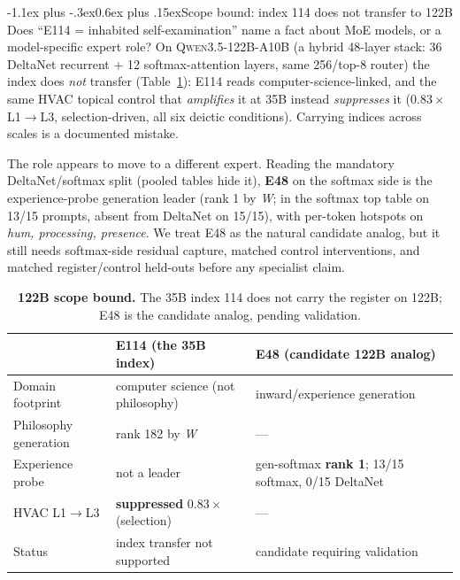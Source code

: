 \documentclass[10pt]{article}
\makeatletter
\renewcommand\section{\@startsection{section}{1}{\z@}%
  {-1.1ex plus -.3ex}{0.6ex plus .15ex}{\normalfont\large\bfseries}}
\newcommand{\W}{\textit{W}}
\makeatother
\begin{document}
\vspace{-0.4em}
\section{Scope bound: index 114 does not transfer to 122B}
\vspace{-0.2em}
Does ``E114 = inhabited self-examination'' name a fact about MoE models, or a
model-specific expert role? On \textsc{Qwen3.5-122B-A10B} (a hybrid 48-layer stack: 36 DeltaNet
recurrent + 12 softmax-attention layers, same 256/top-8 router) the index does
\emph{not} transfer (Table~\ref{tab:transfer}): E114 reads
computer-science-linked, and the same HVAC topical control that \emph{amplifies}
it at 35B instead \emph{suppresses} it ($0.83\times$ L1$\to$L3, selection-driven,
all six deictic conditions). Carrying indices across scales is a documented
mistake.

The role appears to move to a different expert. Reading the mandatory
DeltaNet/softmax split (pooled tables hide it), \textbf{E48} on the softmax side
is the experience-probe generation leader (rank 1 by \W; in the softmax top table
on 13/15 prompts, absent from DeltaNet on 15/15), with per-token hotspots on
\textit{hum, processing, presence}. We treat E48 as the natural candidate analog,
but it still needs softmax-side residual capture, matched control interventions,
and matched register/control held-outs before any specialist claim.

\begin{table}[t]
\centering\small
\setlength{\tabcolsep}{6pt}
\begin{tabular}{@{}lll@{}}
\toprule
& \textbf{E114 (the 35B index)} & \textbf{E48 (candidate 122B analog)} \\
\midrule
Domain footprint & computer science (not philosophy) & inward/experience generation \\
Philosophy generation & rank 182 by \W & --- \\
Experience probe & not a leader & gen-softmax \textbf{rank 1}; 13/15 softmax, 0/15 DeltaNet \\
HVAC L1$\rightarrow$L3 & \textbf{suppressed} $0.83\times$ (selection) & --- \\
Status & index transfer not supported & candidate requiring validation \\
\bottomrule
\end{tabular}
\caption{\textbf{122B scope bound.} The 35B index 114 does not carry the register
on 122B; E48 is the candidate analog, pending validation.}
\label{tab:transfer}
\vspace{-1.4em}
\end{table}
\end{document}
